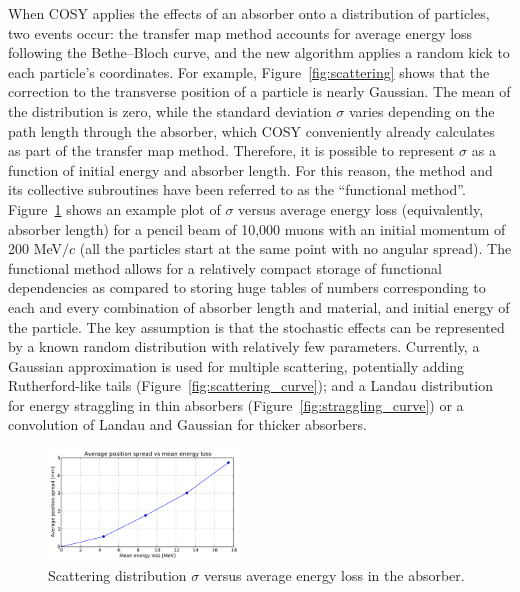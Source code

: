 \documentclass{jacow}
\begin{document}
When COSY applies the effects of an absorber onto a distribution of particles, two events occur: the transfer map method accounts for average energy loss following the Bethe--Bloch curve, and the new algorithm applies a random kick to each particle's coordinates. For example, Figure~\ref{fig:scattering} shows that the correction to the transverse position of a particle is nearly Gaussian. The mean of the distribution is zero, while the standard deviation $\sigma$ varies depending on the path length through the absorber, which COSY conveniently already calculates as part of the transfer map method. Therefore, it is possible to represent $\sigma$ as a function of initial energy and absorber length. For this reason, the method and its collective subroutines have been referred to as the ``functional method''. Figure~\ref{fig:functional} shows an example plot of $\sigma$ versus average energy loss (equivalently, absorber length) for a pencil beam of 10,000 muons with an initial momentum of 200 MeV$/c$ (all the particles start at the same point with no angular spread). The functional method allows for a relatively compact storage of functional dependencies as compared to storing huge tables of numbers corresponding to each and every combination of absorber length and material, and initial energy of the particle. The key assumption is that the stochastic effects can be represented by a known random distribution with relatively few parameters. Currently, a Gaussian approximation is used for multiple scattering, potentially adding Rutherford-like tails (Figure~\ref{fig:scattering_curve}); and a Landau distribution for energy straggling in thin absorbers (Figure~\ref{fig:straggling_curve}) or a convolution of Landau and Gaussian for thicker absorbers.

\begin{figure}[htf]
\centering
\includegraphics[width=0.45\textwidth]{figures/functional.pdf}
\caption{Scattering distribution $\sigma$ versus average energy loss in the absorber.}
\label{fig:functional}
\end{figure}
\end{document}
